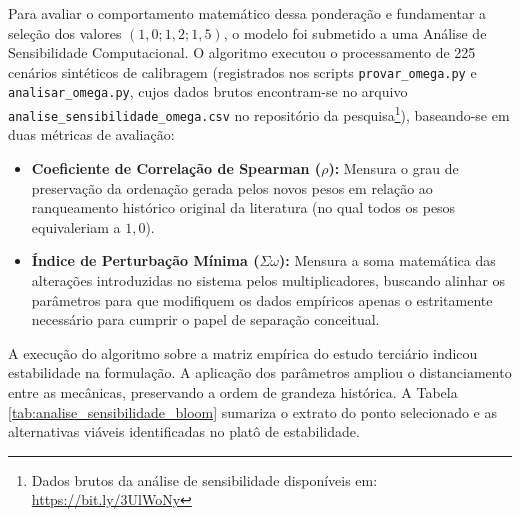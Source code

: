Para avaliar o comportamento matemático dessa ponderação e fundamentar a seleção dos valores $(1,0; 1,2; 1,5)$, o modelo foi submetido a uma Análise de Sensibilidade Computacional. O algoritmo executou o processamento de 225 cenários sintéticos de calibragem (registrados nos scripts \texttt{provar\_omega.py} e \texttt{analisar\_omega.py}, cujos dados brutos encontram-se no arquivo \texttt{analise\_sensibilidade\_omega.csv} no repositório da pesquisa\footnote{Dados brutos da análise de sensibilidade disponíveis em: \url{https://bit.ly/3UlWoNy}}), baseando-se em duas métricas de avaliação:

\begin{itemize}
    \item \textbf{Coeficiente de Correlação de Spearman ($\rho$):} Mensura o grau de preservação da ordenação gerada pelos novos pesos em relação ao ranqueamento histórico original da literatura (no qual todos os pesos equivaleriam a $1,0$).
    \item \textbf{Índice de Perturbação Mínima ($\Sigma \omega$):} Mensura a soma matemática das alterações introduzidas no sistema pelos multiplicadores, buscando alinhar os parâmetros para que modifiquem os dados empíricos apenas o estritamente necessário para cumprir o papel de separação conceitual.
\end{itemize}

A execução do algoritmo sobre a matriz empírica do estudo terciário indicou estabilidade na formulação. A aplicação dos parâmetros ampliou o distanciamento entre as mecânicas, preservando a ordem de grandeza histórica. A Tabela \ref{tab:analise_sensibilidade_bloom} sumariza o extrato do ponto selecionado e as alternativas viáveis identificadas no platô de estabilidade.

\begin{table}[htpb]
\centering
\caption{Análise de Sensibilidade dos Parâmetros de Ponderação dos Impactos Pedagógicos.}
\label{tab:analise_sensibilidade_bloom}
\end{table}

